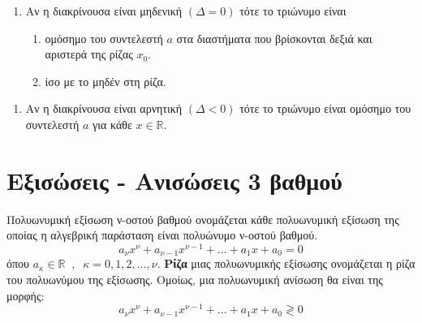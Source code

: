 \begin{enumerate}[itemsep=0mm,start=2]
\item Αν η διακρίνουσα είναι μηδενική $\left( \varDelta=0\right)  $ τότε το τριώνυμο είναι
\begin{enumerate}[itemsep=0mm,label=\roman*.]
\item ομόσημο του συντελεστή $ a $ στα διαστήματα που βρίσκονται δεξιά και αριστερά της ρίζας $ x_0 $.
\item ίσο με το μηδέν στη ρίζα.
\end{enumerate}
\end{enumerate}
\begin{center}
\end{center}
\begin{enumerate}[itemsep=0mm,start=3]
\item Αν η διακρίνουσα είναι αρνητική $\left( \varDelta<0\right)  $ τότε το τριώνυμο είναι
ομόσημο του συντελεστή $ a $ για κάθε $ x\in\mathbb{R}$.
\end{enumerate}
\begin{center}
\end{center}
\section{Εξισώσεις - Ανισώσεις 3 βαθμού}
\orismoi
{}
Πολυωνυμική εξίσωση ν-οστού βαθμού ονομάζεται κάθε πολυωνυμική εξίσωση της οποίας η αλγεβρική παράσταση είναι πολυώνυμο ν-οστού βαθμού.
\[ a_\nu x^\nu+a_{\nu-1}x^{\nu-1}+\ldots+a_1x+a_0=0 \]
όπου $ a_\kappa\in\mathbb{R}\;\;,\;\;\kappa=0,1,2,\ldots,\nu $. \textbf{Ρίζα} μιας πολυωνυμικής εξίσωσης ονομάζεται η ρίζα του πολυωνύμου της εξίσωσης. Ομοίως, μια πολυωνυμική ανίσωση θα είναι της μορφής:
\[ a_\nu x^\nu+a_{\nu-1}x^{\nu-1}+\ldots+a_1x+a_0\gtrless0 \]
